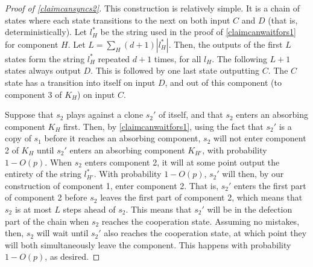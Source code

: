 \documentclass[12pt]{article}
\theoremstyle{definition}
\theoremstyle{remark}
\begin{document}
      \begin{proof}[Proof of \cref{claimcansyncs2}]
        This construction is relatively simple. It is a chain of states where each state transitions to the next on both input $C$ and $D$ (that is, deterministically). Let $l_H^*$ be the string used in the proof of \cref{claimcanwaitfors1} for component $H$. Let $L = \sum_{H} (d+1) | l_H^* |$. Then, the outputs of the first $L$ states form the string $l_H^*$ repeated $d+1$ times, for all $l_H$. The following $L+1$ states always output $D$. This is followed by one last state outputting $C$. The $C$ state has a transition into itself on input $D$, and out of this component (to component 3 of $K_H$) on input $C$.

        Suppose that $s_2$ plays against a clone $s_2'$ of itself, and that $s_2$ enters an absorbing component $K_H$ first. Then, by \cref{claimcanwaitfors1}, using the fact that $s_2'$ is a copy of $s_1$ before it reaches an absorbing component, $s_2$ will not enter component 2 of $K_H$ until $s_2'$ enters an absorbing component $K_{H'}$, with probability $1 - O(p)$. When $s_2$ enters component 2, it will at some point output the entirety of the string $l_{H'}^*$. With probability $1 - O(p)$, $s_2'$ will then, by our construction of component 1, enter component 2. That is, $s_2'$ enters the first part of component 2 before $s_2$ leaves the first part of component 2, which means that $s_2$ is at most $L$ steps ahead of $s_2$. This means that $s_2'$ will be in the defection part of the chain when $s_2$ reaches the cooperation state. Assuming no mistakes, then, $s_2$ will wait until $s_2'$ also reaches the cooperation state, at which point they will both simultaneously leave the component. This happens with probability $1 - O(p)$, as desired.
      \end{proof}
\end{document}
